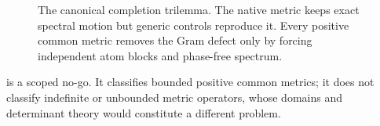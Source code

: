 \begin{figure}[t]
\centering

\caption{The canonical completion trilemma.  The native metric keeps
exact spectral motion but generic controls reproduce it.  Every
positive common metric removes the Gram defect only by forcing
independent atom blocks and phase-free spectrum.}
\label{fig:trilemma}
\end{figure}

 is a scoped no-go.  It classifies bounded positive
common metrics; it does not classify indefinite or unbounded metric
operators, whose domains and determinant theory would constitute a
different problem.
